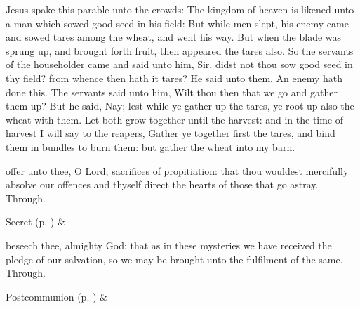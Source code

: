 
 Jesus spake this parable unto the crowds: The kingdom of heaven is likened unto a man which sowed good seed in his field: But while men slept, his enemy came and sowed tares among the wheat, and went his way. But when the blade was sprung up, and brought forth fruit, then appeared the tares also. So the servants of the householder came and said unto him, Sir, didst not thou sow good seed in thy field? from whence then hath it tares? He said unto them, An enemy hath done this. The servants said unto him, Wilt thou then that we go and gather them up? But he said, Nay; lest while ye gather up the tares, ye root up also the wheat with them. Let both grow together until the harvest: and in the time of harvest I will say to the reapers, Gather ye together first the tares, and bind them in bundles to burn them: but gather the wheat into my barn.


\secret\label{EpiphanyVSecret}
 offer unto thee, O Lord, sacrifices of propitiation: that thou wouldest mercifully absolve our offences and thyself direct the hearts of those that go astray. Through.
\begin{rubric}
     Secret  (p. \pageref{SPSaints}) \&  
\end{rubric}


\postcommunion\label{EpiphanyVPostcommunion}
 beseech thee, almighty God: that as in these mysteries we have received the pledge of our salvation, so we may be brought unto the fulfilment of the same. Through.
\begin{rubric}
     Postcommunion  (p. \pageref{SPSaints}) \&  
\end{rubric}


\clearpage
{}


